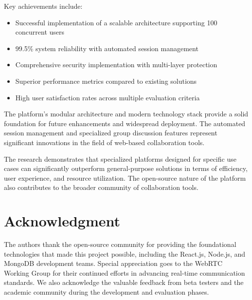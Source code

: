 \documentclass[conference]{IEEEtran}
\begin{document}
Key achievements include:
\begin{itemize}
\item Successful implementation of a scalable architecture supporting 100 concurrent users
\item 99.5\% system reliability with automated session management
\item Comprehensive security implementation with multi-layer protection
\item Superior performance metrics compared to existing solutions
\item High user satisfaction rates across multiple evaluation criteria
\end{itemize}

The platform's modular architecture and modern technology stack provide a solid foundation for future enhancements and widespread deployment. The automated session management and specialized group discussion features represent significant innovations in the field of web-based collaboration tools.

The research demonstrates that specialized platforms designed for specific use cases can significantly outperform general-purpose solutions in terms of efficiency, user experience, and resource utilization. The open-source nature of the platform also contributes to the broader community of collaboration tools.

\section*{Acknowledgment}

The authors thank the open-source community for providing the foundational technologies that made this project possible, including the React.js, Node.js, and MongoDB development teams. Special appreciation goes to the WebRTC Working Group for their continued efforts in advancing real-time communication standards. We also acknowledge the valuable feedback from beta testers and the academic community during the development and evaluation phases.
\end{document}
